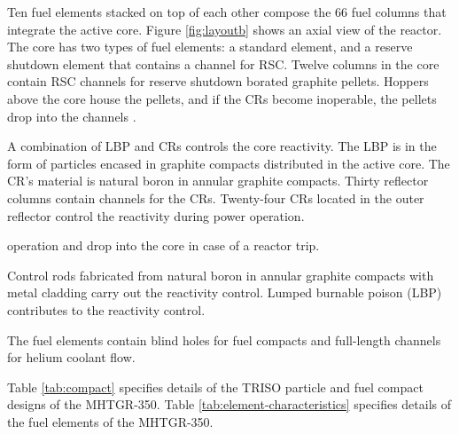 \documentclass[11pt,letterpaper]{article}
\begin{document}
Ten fuel elements stacked on top of each other compose the 66 fuel columns that integrate the active core.
Figure \ref{fig:layoutb} shows an axial view of the reactor.
The core has two types of fuel elements: a standard element, and a reserve shutdown element that contains a channel for \gls{RSC}.
Twelve columns in the core contain \gls{RSC} channels for reserve shutdown borated graphite pellets.
Hoppers above the core house the pellets, and if the \glspl{CR} become inoperable, the pellets drop into the channels \cite{oecd_nea_benchmark_2017}.

A combination of \gls{LBP} and \glspl{CR} controls the core reactivity.
The \gls{LBP} is in the form of particles encased in graphite compacts distributed in the active core.
The \gls{CR}'s material is natural boron in annular graphite compacts.
Thirty reflector columns contain channels for the \glspl{CR}.
Twenty-four \glspl{CR} located in the outer reflector control the reactivity during power operation.



operation and drop into the core in case of a reactor trip.




Control rods fabricated from natural boron in annular graphite compacts with metal cladding carry out the reactivity control.
Lumped burnable poison (LBP) contributes to the reactivity control.


The fuel elements contain blind holes for fuel compacts and full-length channels for helium coolant flow.

Table \ref{tab:compact} specifies details of the TRISO particle and fuel compact designs of the \gls{MHTGR}-350.
Table \ref{tab:element-characteristics} specifies details of the fuel elements of the MHTGR-350.
\end{document}
